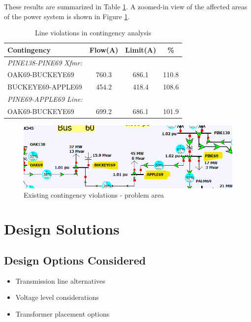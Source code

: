 \documentclass[conference]{IEEEtran}
\begin{document}
These results are summarized in Table \ref{tab:violations}. A zoomed-in view of the affected areas of the power system is shown in Figure \ref{fig:baseviolations}.
\begin{table}[htbp]
	\caption{Line violations in contingency analysis}
	\begin{center}
		\begin{tabular}{|l|c|c|c|}
			\hline
			\textbf{Contingency} & \textbf{Flow(A)} & \textbf{Limit(A)} & \textbf{\%} \\
			\hline
			\textit{PINE138-PINE69 Xfmr:} & & & \\
			OAK69-BUCKEYE69 & 760.3 & 686.1 & 110.8 \\
			BUCKEYE69-APPLE69 & 454.2 & 418.4 & 108.6 \\
			\hline
			\textit{PINE69-APPLE69 Line:} & & & \\
			OAK69-BUCKEYE69 & 699.2 & 686.1 & 101.9 \\
			\hline
		\end{tabular}
		\label{tab:violations}
	\end{center}
\end{table}
\begin{figure}[tbph]
	\centering
	\includegraphics[width=1\linewidth]{figures/base_violations}
	\caption{Existing contingency violations - problem area}
	\label{fig:baseviolations}
\end{figure}
\section{Design Solutions}
\subsection{Design Options Considered}
\begin{itemize}
	\item Transmission line alternatives
	\item Voltage level considerations
	\item Transformer placement options
\end{itemize}
\end{document}
